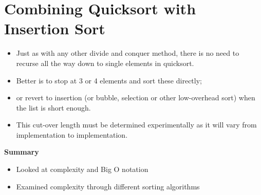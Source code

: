 \documentclass{beamer}
\begin{document}
\section{Combining Quicksort with Insertion Sort}
\begin{frame}
\begin{itemize}
\item Just as with any other divide and conquer method, there is no need to recurse all the way down to single elements
in quicksort.
\item Better is to stop at 3 or 4 elements and sort these directly;
\item or revert to insertion (or bubble, selection or other low-overhead sort) when the list is short enough.
\item This cut-over length must be determined experimentally as it will vary from implementation to implementation.
\end{itemize}

\end{frame} 

\begin{frame}
\begin{center}
\textbf{Summary}
\end{center}
\begin{itemize}
\item Looked at complexity and Big O notation
\item Examined complexity through different sorting algorithms
\end{itemize}
\end{frame} 
\end{document}

